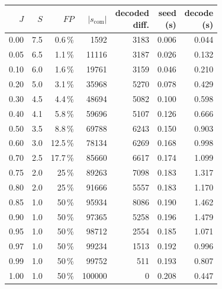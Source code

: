 \begin{table}[t]
    \centering
    \caption{}
    \label{tab:rbf-phase-split}
    \begin{tabular}{rrrrrrr}
      \toprule
      $J$ & $S$ & $FP$ & $|s_{\mathrm{com}}|$ &
        \makecell{decoded\\diff.} & \makecell{seed\\(s)} & \makecell{decode\\(s)} \\
      \midrule
      0.00 & 7.5 & 0.6\,\% & 1592 & 3183 & 0.006 & 0.044 \\
      0.05 & 6.5 & 1.1\,\% & 11116 & 3187 & 0.026 & 0.132 \\
      0.10 & 6.0 & 1.6\,\% & 19761 & 3159 & 0.046 & 0.210 \\
      0.20 & 5.0 & 3.1\,\% & 35968 & 5270 & 0.078 & 0.429 \\
      0.30 & 4.5 & 4.4\,\% & 48694 & 5082 & 0.100 & 0.598 \\
      0.40 & 4.1 & 5.8\,\% & 59696 & 5107 & 0.126 & 0.666 \\
      0.50 & 3.5 & 8.8\,\% & 69788 & 6243 & 0.150 & 0.903 \\
      0.60 & 3.0 & 12.5\,\% & 78134 & 6269 & 0.168 & 0.998 \\
      0.70 & 2.5 & 17.7\,\% & 85660 & 6617 & 0.174 & 1.099 \\
      0.75 & 2.0 & 25\,\% & 89263 & 7098 & 0.183 & 1.317 \\
      0.80 & 2.0 & 25\,\% & 91666 & 5557 & 0.183 & 1.170 \\
      0.85 & 1.0 & 50\,\% & 95934 & 8086 & 0.190 & 1.462 \\
      0.90 & 1.0 & 50\,\% & 97365 & 5258 & 0.196 & 1.479 \\
      0.95 & 1.0 & 50\,\% & 98712 & 2554 & 0.185 & 1.071 \\
      0.97 & 1.0 & 50\,\% & 99234 & 1513 & 0.192 & 0.996 \\
      0.99 & 1.0 & 50\,\% & 99752 & 511 & 0.193 & 0.807 \\
      1.00 & 1.0 & 50\,\% & 100000 & 0 & 0.208 & 0.447 \\
      \bottomrule
    \end{tabular}
  \end{table}

